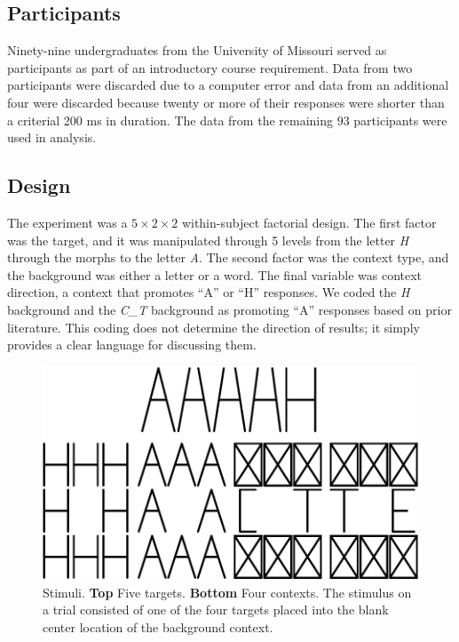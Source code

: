 \documentclass[english,floatsintext,man]{apa6}
\theoremstyle{definition}
\theoremstyle{definition}
\theoremstyle{definition}
\theoremstyle{remark}
\begin{document}
\subsection{Participants}\label{participants}

Ninety-nine undergraduates from the University of Missouri served as
participants as part of an introductory course requirement. Data from
two participants were discarded due to a computer error and data from an
additional four were discarded because twenty or more of their responses
were shorter than a criterial 200 ms in duration. The data from the
remaining \(93\) participants were used in analysis.

\subsection{Design}\label{design}

The experiment was a \(5\times 2 \times 2\) within-subject factorial
design. The first factor was the target, and it was manipulated through
5 levels from the letter \emph{H} through the morphs to the letter
\emph{A}. The second factor was the context type, and the background was
either a letter or a word. The final variable was context direction, a
context that promotes \enquote{A} or \enquote{H} responses. We coded the
\emph{H} background and the \emph{C\_T} background as promoting
\enquote{A} responses based on prior literature. This coding does not
determine the direction of results; it simply provides a clear language
for discussing them.

\begin{figure}[htbp]
\centering
\includegraphics{paper_files/figure-latex/stimulus-1.pdf}
\caption{\label{fig:stimulus}Stimuli. \textbf{Top} Five targets.
\textbf{Bottom} Four contexts. The stimulus on a trial consisted of one
of the four targets placed into the blank center location of the
background context.}
\end{figure}
\end{document}
